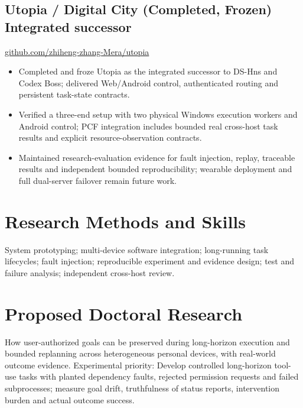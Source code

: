 \documentclass[10pt,a4paper]{article}
\begin{document}
\subsection*{Utopia / Digital City (Completed, Frozen) \hfill \small Integrated successor}
\href{https://github.com/zhiheng-zhang-Mera/utopia}{github.com/zhiheng-zhang-Mera/utopia}
\begin{itemize}
\item Completed and froze Utopia as the integrated successor to DS-Hns and Codex Boss; delivered Web/Android control, authenticated routing and persistent task-state contracts.
\item Verified a three-end setup with two physical Windows execution workers and Android control; PCF integration includes bounded real cross-host task results and explicit resource-observation contracts.
\item Maintained research-evaluation evidence for fault injection, replay, traceable results and independent bounded reproducibility; wearable deployment and full dual-server failover remain future work.
\end{itemize}

\section{Research Methods and Skills}
System prototyping; multi-device software integration; long-running task lifecycles; fault injection; reproducible experiment and evidence design; test and failure analysis; independent cross-host review.

\section{Proposed Doctoral Research}
How user-authorized goals can be preserved during long-horizon execution and bounded replanning across heterogeneous personal devices, with real-world outcome evidence. Experimental priority: Develop controlled long-horizon tool-use tasks with planted dependency faults, rejected permission requests and failed subprocesses; measure goal drift, truthfulness of status reports, intervention burden and actual outcome success.

\par\smallskip{}
\end{document}
